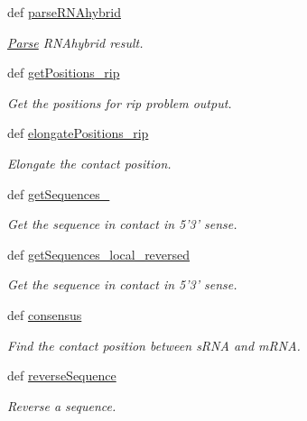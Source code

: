 \begin{DoxyCompactItemize}
def \hyperlink{classirna_1_1iRNA__pred_1_1Parse_1_1Parse_a7a343acd4a9865df9761c8252e20d443}{parse\-R\-N\-Ahybrid}
\begin{DoxyCompactList}\small\item\em \hyperlink{classirna_1_1iRNA__pred_1_1Parse_1_1Parse}{\-Parse} \-R\-N\-Ahybrid result. \end{DoxyCompactList}\item 
def \hyperlink{classirna_1_1iRNA__pred_1_1Parse_1_1Parse_add46e7cf4129464b35b2f7324e59eff4}{get\-Positions\-\_\-rip}
\begin{DoxyCompactList}\small\item\em \-Get the positions for rip problem output. \end{DoxyCompactList}\item 
def \hyperlink{classirna_1_1iRNA__pred_1_1Parse_1_1Parse_a08ae56bda46de6246c13398bf9110c18}{elongate\-Positions\-\_\-rip}
\begin{DoxyCompactList}\small\item\em \-Elongate the contact position. \end{DoxyCompactList}\item 
def \hyperlink{classirna_1_1iRNA__pred_1_1Parse_1_1Parse_af188b8c65c88aa87e4ebe96f47cf5f2b}{get\-Sequences\-\_}
\begin{DoxyCompactList}\small\item\em \-Get the sequence in contact in 5'3' sense. \end{DoxyCompactList}\item 
def \hyperlink{classirna_1_1iRNA__pred_1_1Parse_1_1Parse_ab5ef54058dfa4fd71bd6f24364f513ce}{get\-Sequences\-\_\-local\-\_\-reversed}
\begin{DoxyCompactList}\small\item\em \-Get the sequence in contact in 5'3' sense. \end{DoxyCompactList}\item 
def \hyperlink{classirna_1_1iRNA__pred_1_1Parse_1_1Parse_ac819bada70d8525ee85d69411f150437}{consensus}
\begin{DoxyCompactList}\small\item\em \-Find the contact position between s\-R\-N\-A and m\-R\-N\-A. \end{DoxyCompactList}\item 
def \hyperlink{classirna_1_1iRNA__pred_1_1Parse_1_1Parse_a4770d1fb5db5e459499e25af700206e6}{reverse\-Sequence}
\begin{DoxyCompactList}\small\item\em \-Reverse a sequence. \end{DoxyCompactList}\item 

\end{DoxyCompactItemize}
